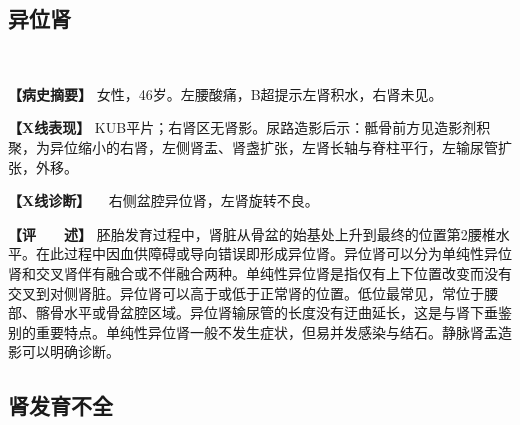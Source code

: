 \subsection{异位肾}

\begin{figure}
    \centering
    \\
    \caption{}
    \label{fig6-2-3}
\end{figure}

\textbf{【病史摘要】}
女性，46岁。左腰酸痛，B超提示左肾积水，右肾未见。

\textbf{【X线表现】}
KUB平片；右肾区无肾影。尿路造影后示：骶骨前方见造影剂积聚，为异位缩小的右肾，左侧肾盂、肾盏扩张，左肾长轴与脊柱平行，左输尿管扩张，外移。

\textbf{【X线诊断】} 　右侧盆腔异位肾，左肾旋转不良。

\textbf{【评　　述】}
胚胎发育过程中，肾脏从骨盆的始基处上升到最终的位置第2腰椎水平。在此过程中因血供障碍或导向错误即形成异位肾。异位肾可以分为单纯性异位肾和交叉肾伴有融合或不伴融合两种。单纯性异位肾是指仅有上下位置改变而没有交叉到对侧肾脏。异位肾可以高于或低于正常肾的位置。低位最常见，常位于腰部、髂骨水平或骨盆腔区域。异位肾输尿管的长度没有迂曲延长，这是与肾下垂鉴别的重要特点。单纯性异位肾一般不发生症状，但易并发感染与结石。静脉肾盂造影可以明确诊断。

\subsection{肾发育不全}

\begin{figure}
    \centering
    \\
        \\
    \caption{}
    \label{fig6-2-4}
\end{figure}



